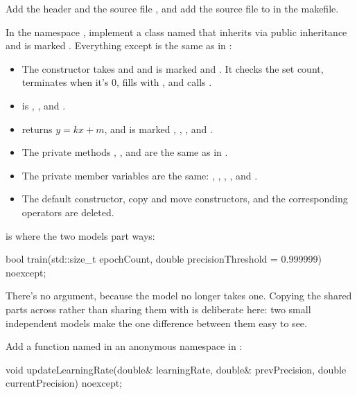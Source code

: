 \label{c2:ex:11}
Add the header  and the source file
, and add the source file to  in the makefile.

In the namespace , implement a class named  that inherits
 via public inheritance and is marked . Everything except
 is the same as in :
\begin{itemize}
  \item The constructor takes  and  and is marked  and
    . It checks the set count, terminates when it's 0, fills 
    with , and calls .
  \item {} is , , and .
  \item {} returns $y = kx + m$, and is marked \code{[[nodiscard]]}, ,
    , and .
  \item The private methods , , and  are the same
    as in .
  \item The private member variables are the same: , ,
    , , and .
  \item The default constructor, copy and move constructors, and the corresponding operators are
    deleted.
\end{itemize}
 is where the two models part ways:

\begin{cppcode}
bool train(std::size_t epochCount, double precisionThreshold = 0.999999) noexcept;
\end{cppcode}

\noindent There's no  argument, because the model no longer takes one. Copying
the shared parts across rather than sharing them with  is deliberate here: two small
independent models make the one difference between them easy to see.

\label{c2:ex:12}
Add a function named  in an anonymous namespace in
:

\begin{cppcode}
void updateLearningRate(double& learningRate, double& prevPrecision,
                        double currentPrecision) noexcept;
\end{cppcode}

